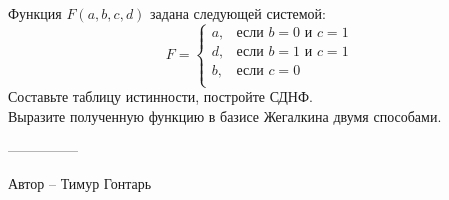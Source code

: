\question
Функция $F(a, b, c, d)$ задана следующей системой:
\begin{equation*}
    F =
    \begin{cases}
        a, &\text{если $b=0$ и $c=1$}\\
        d, &\text{если $b=1$ и $c=1$}\\
        b, &\text{если $c=0$}\\
    \end{cases}
\end{equation*}
Составьте таблицу истинности, постройте СДНФ.
\\
Выразите полученную функцию в базисе Жегалкина двумя способами.

---------------

Автор -- Тимур Гонтарь
